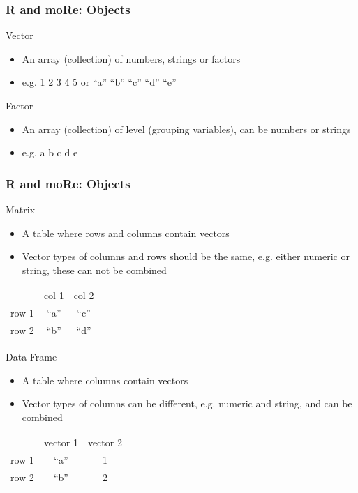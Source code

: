 \documentclass{beamer}
\begin{document}

\begin{frame}
\frametitle{R and moRe: Objects}
\begin{block}{Vector}
\begin{itemize}
\item An array (collection) of numbers, strings or factors
\item e.g. \alert{1 2 3 4 5} or \alert{``a'' ``b'' ``c'' ``d'' ``e''}
\end{itemize}
\end{block}
\vspace{1 cm}
\pause
\begin{block}{Factor}
\begin{itemize}
\item An array (collection) of level (grouping variables), can be numbers or strings
\item e.g. \alert{a b c d e}
\end{itemize}
\end{block}
\end{frame}



\begin{frame}
\frametitle{R and moRe: Objects}
\begin{block}{Matrix}
\begin{itemize}
\item A table where rows and columns contain vectors
\item Vector types of columns and rows should be the same, e.g. either numeric or string, these can not be combined 
\end{itemize}
\begin{tabular} {c c c}
 & \alert{col 1} & \alert{col 2}\\
\alert{row 1} & \alert{``a''} & \alert{``c''}\\
\alert{row 2} & \alert{``b''} & \alert{``d''}\\
\end{tabular}
\end{block}
\pause
\begin{block}{Data Frame}
\begin{itemize}
\item A table where columns contain vectors
\item Vector types of columns can be different, e.g. numeric and string, and can be combined 
\end{itemize}
\begin{tabular} {c c c}
 & \alert{vector 1} & \alert{vector 2}\\
\alert{row 1} & \alert{``a''} & \alert{1}\\
\alert{row 2} & \alert{``b''} & \alert{2}\\
\end{tabular}
\end{block}
\end{frame}
\end{document}
